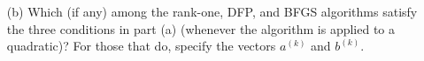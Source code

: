 \documentclass{article}
\begin{document}
\begin{enumerate}
\begin{bb}
\begin{enumerate}
    \item[(b)] Which (if any) among the rank-one, DFP, and BFGS algorithms satisfy the three conditions in part (a) (whenever the algorithm is applied to a quadratic)? For those that do, specify the vectors $a^{(k)}$ and $b^{(k)}$.
\end{enumerate}
\end{bb}

\end{enumerate}
\end{document}
